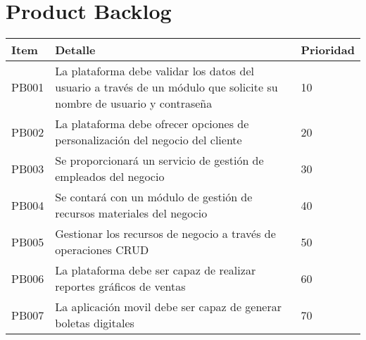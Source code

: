 \chapter{Product Backlog}

\begin{table}[htbp]
	\begin{center}
		\begin{tabular}{|p{1.2cm} | p{12cm} | p{2cm} |}
			\hline
			Item & Detalle & Prioridad \\
			\hline
			PB001 & La plataforma debe validar los datos del usuario a través de un módulo que solicite su nombre de usuario y contraseña & 10 \\
			\hline
			PB002 & La plataforma debe ofrecer opciones de personalización del negocio del cliente & 20  \\
			\hline
			PB003 & Se proporcionará un servicio de gestión de empleados del negocio & 30  \\
			\hline
			PB004 & Se contará con un módulo de gestión de recursos materiales del negocio & 40 \\
			\hline
			PB005 & Gestionar los recursos de negocio a través de operaciones CRUD & 50 \\
			\hline	
			PB006 & La plataforma debe ser capaz de realizar reportes gráficos de ventas & 60 \\
			\hline
			PB007 & La aplicación movil debe ser capaz de generar boletas digitales & 70 \\
			\hline
		\end{tabular}
	\end{center}
\end{table}
